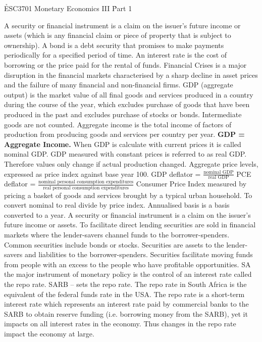 \documentclass[12pt]{examnotes}
\begin{document}
\obeylines  
\setlength\baselineskip{15pt}

\h{ESC3701 Monetary Economics III}
\h{Part 1}

\ra A security or financial instrument is a claim on the issuer’s future income or assets (which is any financial claim or piece of property that is subject to ownership). 
\ra A bond is a debt security that promises to make payments periodically for a specified period of time. 
\ra An interest rate is the cost of borrowing or the price paid for the rental of funds. 
\ra Financial Crises is a  major disruption in the financial markets characterised by a sharp decline in asset prices and the failure of many financial and non-financial firms. 
\ra GDP (aggregate output) is the market value of all final goods and services produced in a country during the course of the year, which excludes purchase of goods that have been produced in the past and excludes purchase of stocks or bonds. Intermediate goods are not counted.
\ra Aggregate income is the total income of factors of production from producing goods and services per country per year. {\bf GDP = Aggregate Income.} 
\ra When GDP is calculate with current prices it is called nominal GDP. 
\ra GDP measured with constant prices is referred to as real GDP. Therefore values only change if actual production changed.
 Aggregate price levels, expressed as price index against base year 100.
\vspace{6pt}
 GDP deflator =  $\displaystyle\frac{\text{nominal GDP}}{\text{real GDP}}$ 
\vspace{6pt}
 PCE deflator =  $\displaystyle\frac{\text{nominal personal consumption expenditures}}{\text{real personal consumption expenditures}}$ 
\vspace{6pt}
 Consumer Price Index measured by pricing a basket of goods and services brought by a typical urban household.
\ra To convert nominal to real divide by price index. Annualised basis is a basis converted to a year. 
\vspace{6pt}
\ra A security or financial instrument is a claim on the issuer's future income or assets. 
\ra To facilitate direct lending securities are sold in financial markets where the lender-savers channel funds to the borrower-spenders. 
\ra Common securities include bonds or stocks. 
\ra Securities are assets to the lender-savers and liabilities to the borrower-spenders. 
\ra Securities facilitate moving funds from people with an excess to the people who have profitable opportunities. 
\ra SA the major instrument of monetary policy is the control of an interest rate called the repo rate. \ra SARB – sets the repo rate.
\ra The repo rate in South Africa is the equivalent of the federal funds rate in the USA.
\ra The repo rate is a short-term interest rate which represents an interest rate paid by commercial banks to the SARB to obtain reserve funding (i.e. borrowing money from the SARB), yet it impacts on all interest rates in the economy. Thus changes in the repo rate impact the economy at large.
\end{document}
